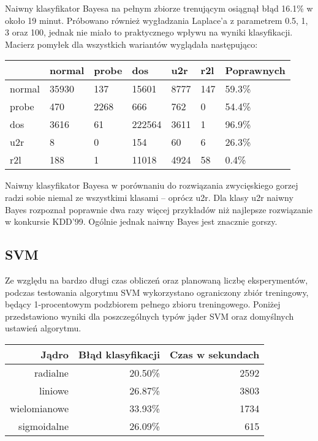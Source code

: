 \documentclass[a4paper, 12pt]{article}
\begin{document}
Naiwny klasyfikator Bayesa na pełnym zbiorze trenującym osiągnął błąd 16.1\% w około 19
minut.
Próbowano również wygładzania Laplace'a z parametrem 0.5, 1, 3 oraz 100, jednak
nie miało to praktycznego wpływu na wyniki klasyfikacji. Macierz pomyłek dla wszystkich
wariantów wyglądała następująco:

\begin{table}[H]
\centering
\begin{tabular}{ | l | l | l | l | l | l | l | } \hline
	& normal & probe & dos 	& u2r 	& r2l 	& Poprawnych	\\ \hline
normal 	& 35930 & 137 	& 15601	& 8777	& 147 	& 59.3\% 	\\ \hline
probe 	& 470 	& 2268 	& 666	& 762	& 0 	& 54.4\% 	\\ \hline
dos 	& 3616 	& 61 	& 222564& 3611 	& 1 	& 96.9\% 	\\ \hline
u2r 	& 8 	& 0 	& 154	& 60	& 6	& 26.3\%	\\ \hline
r2l 	& 188 	& 1 	& 11018	& 4924	& 58	& 0.4\%		\\ \hline
\end{tabular} 
\end{table}

Naiwny klasyfikator Bayesa w porównaniu do rozwiązania zwycięskiego gorzej radzi sobie
niemal ze wszystkimi klasami -- oprócz u2r. Dla klasy u2r naiwny Bayes rozpoznał poprawnie
dwa razy więcej przykładów niż najlepsze rozwiązanie w konkursie KDD'99. 
Ogólnie jednak naiwny Bayes jest znacznie gorszy.

\subsection{SVM}

Ze względu na bardzo długi czas obliczeń oraz planowaną liczbę eksperymentów, podczas testowania algorytmu SVM wykorzystano ograniczony zbiór treningowy, będący 1-procentowym
podzbiorem pełnego zbioru treningowego. Poniżej przedstawiono wyniki dla poszczególnych typów jąder SVM oraz domyślnych ustawień algorytmu.

\begin{table}[H]
\centering
\begin{tabular}{ | r | r | r | } \hline
Jądro & Błąd klasyfikacji & Czas w sekundach \\ \hline
radialne & 20.50\% & 2592 \\ \hline
liniowe & 26.87\% & 3803 \\ \hline
wielomianowe & 33.93\% & 1734 \\ \hline
sigmoidalne & 26.09\% & 615 \\ \hline
\end{tabular} 
\end{table}
\end{document}
